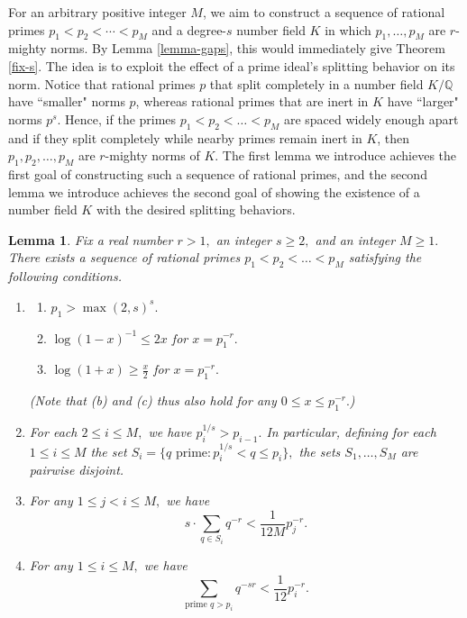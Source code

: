 \documentclass[12pt]{amsart}
\newtheorem{lemma}[theorem]{Lemma}
\theoremstyle{definition}
\numberwithin{equation}{section}
\newcommand{\Q}{\mathbb{Q}}
\begin{document}
For an arbitrary positive integer $M$, we aim to construct a sequence of rational primes $p_1 < p_2 < \cdots < p_M$ and a degree-$s$ number field $K$ in which $p_1,\ldots,p_M$ are $r$-mighty norms. By Lemma \ref{lemma-gaps}, this would immediately give Theorem \ref{fix-s}.
The idea is to exploit the effect of a prime ideal's splitting behavior on its norm. Notice that rational primes $p$ that split completely in a number field $K/\Q$ have ``smaller" norms $p$, whereas rational primes that are inert in $K$ have ``larger" norms $p^s$. Hence, if the primes $p_1 < p_2 < \dots < p_M$ are spaced widely enough apart and if they split completely while nearby primes remain inert in $K$, then $p_1,p_2,\ldots,p_M$ are $r$-mighty norms of $K$. The first lemma we introduce achieves the first goal of constructing such a sequence of rational primes, and the second lemma we introduce achieves the second goal of showing the existence of a number field $K$ with the desired splitting behaviors. 

\begin{lemma} \label{technical}
    Fix a real number $r > 1,$ an integer $s \geq 2,$ and an integer $M \geq 1.$ There exists a sequence of rational primes $p_1 < p_2 < \dots < p_M$ satisfying the following conditions. 
    \begin{enumerate}
        \item \begin{enumerate}
            \item $p_1 > \max(2,s)^s.$
            \item $\log(1-x)^{-1} \leq 2x$ for $x = p_1^{-r}.$
            \item $\log(1+x) \geq \frac{x}{2}$ for $x = p_1^{-r}.$
        \end{enumerate} \noindent (Note that (b) and (c) thus also hold for any $0 \leq x \leq p_1^{-r}.$)
        \item For each $2 \leq i \leq M,$ we have $p_i^{1/s} > p_{i-1}.$ In particular, defining for each $1 \leq i \leq M$ the set $S_i = \{q \text{ prime} : p_i^{1/s} < q \leq p_i\},$ the sets $S_1,\ldots,S_M$ are pairwise disjoint.
        \item For any $1 \leq j < i \leq M,$ we have $$s \cdot \sum_{q \in S_i} q^{-r} < \frac{1}{12M} p_j^{-r}.$$
        \item For any $1 \leq i \leq M,$ we have $$\sum_{\text{prime }q > p_i} q^{-sr} < \frac{1}{12}p_i^{-r}.$$
    \end{enumerate}
\end{lemma}
\end{document}
